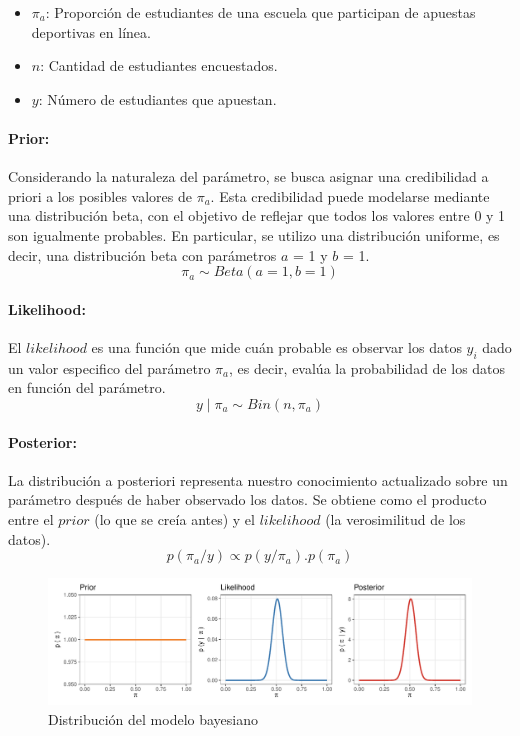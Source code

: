 \documentclass[
]{article}
\begin{document}
\begin{itemize}
\item
  \(\pi_a\): Proporción de estudiantes de una escuela que participan de apuestas deportivas en línea.
\item
  \(n\): Cantidad de estudiantes encuestados.
\item
  \(y\): Número de estudiantes que apuestan.
\end{itemize}

\paragraph{Prior:}\label{prior}

Considerando la naturaleza del parámetro, se busca asignar una credibilidad a priori a los posibles valores de \(\pi_a\). Esta credibilidad puede modelarse mediante una distribución beta, con el objetivo de reflejar que todos los valores entre 0 y 1 son igualmente probables. En particular, se utilizo una distribución uniforme, es decir, una distribución beta con parámetros \(a\) = 1 y \(b\) = 1.
\[ \pi_a \sim Beta(a = 1, b = 1) \]

\FloatBarrier

\paragraph{Likelihood:}\label{likelihood}

El \(likelihood\) es una función que mide cuán probable es observar los datos \(y_i\) dado un valor especifico del parámetro \(\pi_a\), es decir, evalúa la probabilidad de los datos en función del parámetro.
\[ y \mid \pi_a \sim Bin(n , \pi_a) \]

\FloatBarrier

\paragraph{Posterior:}\label{posterior}

La distribución a posteriori representa nuestro conocimiento actualizado sobre un parámetro después de haber observado los datos. Se obtiene como el producto entre el \(prior\) (lo que se creía antes) y el \(likelihood\) (la verosimilitud de los datos).
\[ p(\pi_a/y) \propto p(y/\pi_a).p(\pi_a) \]

\begin{figure}
\centering
\includegraphics{TP-1--Bayes_files/figure-latex/fig1-1.pdf}
\caption{\label{fig:fig1}Distribución del modelo bayesiano}
\end{figure}
\end{document}
